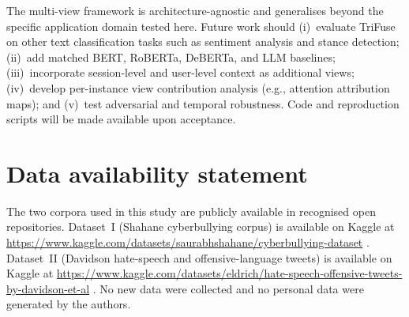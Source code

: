 \documentclass[10pt,twocolumn,a4paper]{article}
\begin{document}
The multi-view framework is architecture-agnostic and generalises beyond the specific application domain tested here. Future work should (i)~evaluate TriFuse on other text classification tasks such as sentiment analysis and stance detection; (ii)~add matched BERT, RoBERTa, DeBERTa, and LLM baselines; (iii)~incorporate session-level and user-level context as additional views; (iv)~develop per-instance view contribution analysis (e.g., attention attribution maps); and (v)~test adversarial and temporal robustness. Code and reproduction scripts will be made available upon acceptance.


\section*{Data availability statement}
The two corpora used in this study are publicly available in recognised open repositories. Dataset~I (Shahane cyberbullying corpus) is available on Kaggle at \url{https://www.kaggle.com/datasets/saurabhshahane/cyberbullying-dataset} \citep{ref10}. Dataset~II (Davidson hate-speech and offensive-language tweets) is available on Kaggle at \url{https://www.kaggle.com/datasets/eldrich/hate-speech-offensive-tweets-by-davidson-et-al} \citep{ref11}. No new data were collected and no personal data were generated by the authors.
\end{document}

